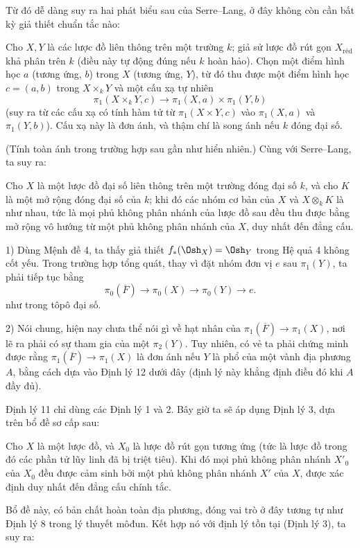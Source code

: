 Từ đó dễ dàng suy ra hai phát biểu sau của Serre--Lang, ở đây không còn cần
bất kỳ giả thiết chuẩn tắc nào:

 Cho $X,Y$ là các lược đồ liên thông trên một trường $k$;
giả sử lược đồ rút gọn $X_{\mathrm{réd}}$ khả phân trên $k$ (điều này tự động
đúng nếu $k$ hoàn hảo). Chọn một
điểm hình học $a$ (tương ứng, $b$) trong $X$ (tương ứng, $Y$), từ đó thu được
một điểm hình học $c=(a,b)$ trong $X\times_kY$ và một cấu xạ tự nhiên
\[
  \pi_1(X\times_kY,c)\longrightarrow
  \pi_1(X,a)\times\pi_1(Y,b)
\]
(suy ra từ các cấu xạ có tính hàm tử từ $\pi_1(X\times Y,c)$ vào
$\pi_1(X,a)$ và $\pi_1(Y,b)$). Cấu xạ này là đơn ánh, và thậm chí là song ánh
nếu $k$ đóng đại số.

(Tính toàn ánh trong trường hợp sau gần như hiển nhiên.) Cùng với Serre--Lang,
ta suy ra:

 Cho $X$ là một lược đồ đại số liên thông trên một trường
đóng đại số $k$, và cho $K$ là một mở rộng đóng đại số của $k$;
khi đó các nhóm cơ bản của $X$ và $X\otimes_kK$ là như nhau, tức là mọi phủ
không phân nhánh của lược đồ sau đều thu được bằng mở rộng vô hướng từ một phủ
không phân nhánh của $X$, duy nhất đến đẳng cấu.


1) Dùng Mệnh đề 4, ta thấy giả thiết $f_*(\Osh_X)=\Osh_Y$ trong Hệ quả 4 không
cốt yếu. Trong trường hợp tổng quát, thay vì đặt nhóm đơn vị $e$ sau
$\pi_1(Y)$, ta phải tiếp tục bằng
\[
  \pi_0(\overline F)\longrightarrow\pi_0(X)
  \longrightarrow\pi_0(Y)\longrightarrow e.
\]
như trong tôpô đại số.

2) Nói chung, hiện nay chưa thể nói gì về hạt nhân của
$\pi_1(\overline F)\longrightarrow\pi_1(X)$, nơi lẽ ra phải có sự tham gia của
một $\pi_2(Y)$. Tuy nhiên, có vẻ ta phải chứng minh được rằng
$\pi_1(\overline F)\longrightarrow\pi_1(X)$ là đơn ánh nếu $Y$ là phổ của một
vành địa phương $A$, bằng cách dựa vào Định lý 12 dưới đây (định lý này khẳng
định điều đó khi $A$ đầy đủ).

Định lý 11 chỉ dùng các Định lý 1 và 2. Bây giờ ta sẽ áp dụng Định lý 3, dựa
trên bổ đề sơ cấp sau:

 Cho $X$ là một lược đồ, và $X_0$ là lược đồ rút gọn tương
ứng (tức là lược đồ trong đó các phần tử lũy linh đã bị triệt tiêu). Khi đó mọi
phủ không phân nhánh $X'_0$ của $X_0$ đều được cảm sinh bởi một phủ không phân
nhánh $X'$ của $X$, được xác định duy nhất đến đẳng cấu chính tắc.

Bổ đề này, có bản chất hoàn toàn địa phương, đóng vai trò ở đây tương tự như
Định lý 8 trong lý thuyết môđun. Kết hợp nó với định lý tồn tại (Định lý 3),
ta suy ra:

